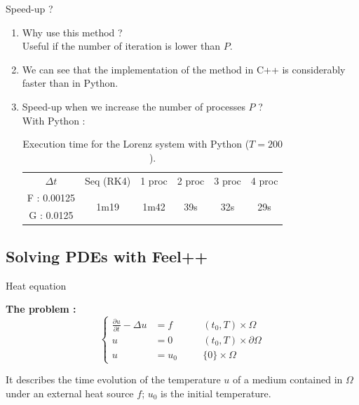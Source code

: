 \begin{frame}{Speed-up ?}
	\begin{enumerate}[\textbullet]
		\item Why use this method ? \\
		Useful if the number of iteration is lower than $P$. \\
		
		\item We can see that the implementation of the method in C++ is considerably faster than in Python. \\
		
		\item Speed-up when we increase the number of processes $P$ ? \\
		With Python :
		\begin{table}[H]
			\centering
			\begin{tabular}{| c || c | c | c | c | c |}
				\hline
				\multirow{2}{1.5 cm}{$\Delta t$} & \multirow{2}{1.5 cm}{Seq (RK4)} & \multirow{2}{1.5 cm}{1 proc} & \multirow{2}{1.5 cm}{2 proc} & \multirow{2}{1.5 cm}{3 proc} &\multirow{2}{1.5 cm}{4 proc} \\
				& & & & & \\
				\hline 
				F : 0.00125 & \multirow{2}{1.5 cm}{1m19} & \multirow{2}{1.5 cm}{1m42} & \multirow{2}{1.5 cm}{39s} & \multirow{2}{1.5 cm}{32s} & \multirow{2}{1.5 cm}{29s} \\
				G : 0.0125 & & & & & \\	 
				\hline
			\end{tabular}
			\caption{Execution time for the Lorenz system with Python ($T=200$).}
			\label{time}
		\end{table}
	\end{enumerate}
\end{frame}






\subsection{Solving PDEs with Feel++}

\begin{frame}{Heat equation}
	
	\textbf{The problem :}
	$$\left\{\begin{aligned}
		\frac{\partial u}{\partial t}-\Delta u &= f \quad&&(t_0,T)\times\Omega \\
		u&=0 \quad&&(t_0,T)\times\partial\Omega\\
		u&=u_0 \quad &&\{0\}\times\Omega
	\end{aligned}\right.$$

	It describes the time evolution of the temperature $u$ of a medium contained in $\Omega$ under an external heat source $f$; $u_0$ is the initial temperature.
	
\end{frame}

